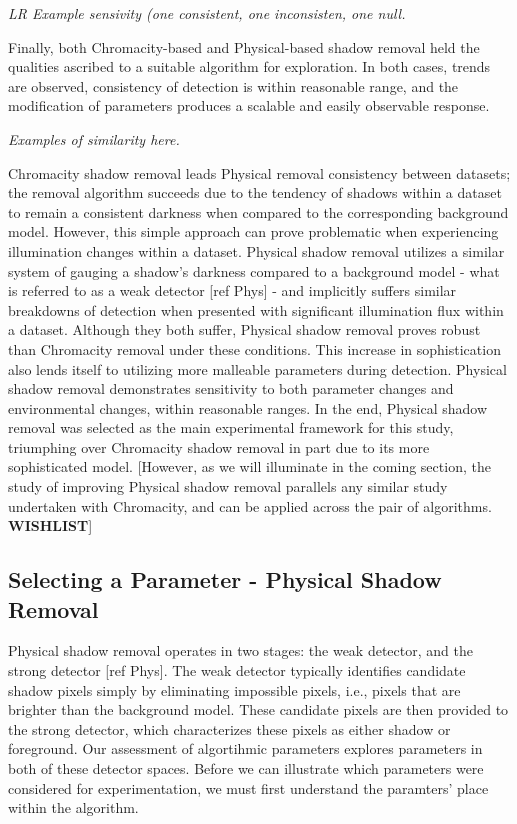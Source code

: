 \documentclass[12pt]{report}
\begin{document}
\textit{LR Example sensivity (one consistent, one inconsisten, one null.}

Finally, both Chromacity-based and Physical-based shadow removal held the qualities ascribed to a suitable algorithm for exploration. In both cases, trends are observed, consistency of detection is within reasonable range, and the modification of parameters produces a scalable and easily observable response.

\textit{Examples of similarity here.}

Chromacity shadow removal leads Physical removal consistency between datasets; the removal algorithm succeeds due to the tendency of shadows within a dataset to remain a consistent darkness when compared to the corresponding background model. However, this simple approach can prove problematic when experiencing illumination changes within a dataset. Physical shadow removal utilizes a similar system of gauging a shadow's darkness compared to a background model - what is referred to as a weak detector [ref Phys] - and implicitly suffers similar breakdowns of detection when presented with significant illumination flux within a dataset. Although they both suffer, Physical shadow removal proves robust than Chromacity removal under these conditions. This increase in sophistication also lends itself to utilizing more malleable parameters during detection. Physical shadow removal demonstrates sensitivity to both parameter changes and environmental changes, within reasonable ranges. In the end, Physical shadow removal was selected as the main experimental framework for this study, triumphing over Chromacity shadow removal in part due to its more sophisticated model. [However, as we will illuminate in the coming section, the study of improving Physical shadow removal parallels any similar study undertaken with Chromacity, and can be applied across the pair of algorithms. \textbf{WISHLIST}]

\subsection{Selecting a Parameter - Physical Shadow Removal}

Physical shadow removal operates in two stages: the weak detector, and the strong detector [ref Phys]. The weak detector typically identifies candidate shadow pixels simply by eliminating impossible pixels, i.e., pixels that are brighter than the background model. These candidate pixels are then provided to the strong detector, which characterizes these pixels as either shadow or foreground. Our assessment of algortihmic parameters explores parameters in both of these detector spaces. Before we can illustrate which parameters were considered for experimentation, we must first understand the paramters' place within the algorithm.
\end{document}
